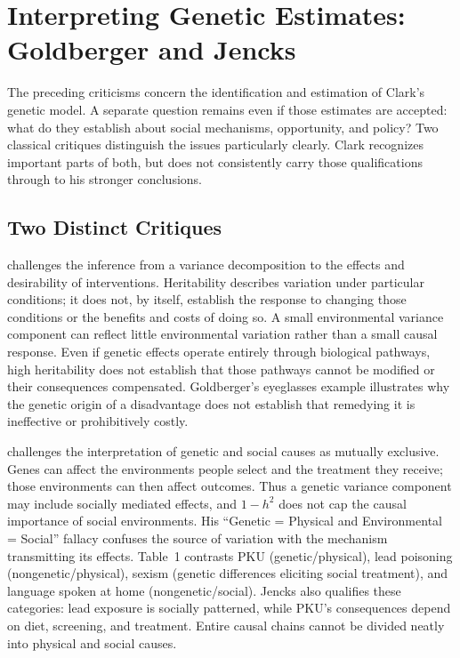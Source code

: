 \section{Interpreting Genetic Estimates: Goldberger and Jencks}
\label{sec:interpretation}

The preceding criticisms concern the identification and estimation of
Clark's genetic model. A separate question remains even if those estimates
are accepted: what do they establish about social mechanisms, opportunity,
and policy? Two classical critiques distinguish the issues particularly
clearly. Clark recognizes important parts of both, but does not consistently
carry those qualifications through to his stronger conclusions.

\subsection{Two Distinct Critiques}

\citet[pp.~344--346]{Goldberger1979} challenges the inference from a
variance decomposition to the effects and desirability of interventions.
Heritability describes variation under particular conditions; it does not,
by itself, establish the response to changing those conditions or the
benefits and costs of doing so. A small environmental variance component
can reflect little environmental variation rather than a small causal
response. Even if genetic effects operate entirely through biological
pathways, high heritability does not establish that those pathways cannot
be modified or their consequences compensated. Goldberger's eyeglasses
example illustrates why the genetic origin of a disadvantage does not
establish that remedying it is ineffective or prohibitively costly.

\citet[pp.~729--734]{Jencks1980} challenges the interpretation of genetic
and social causes as mutually exclusive. Genes can affect the environments
people select and the treatment they receive; those environments can then
affect outcomes. Thus a genetic variance component may include socially
mediated effects, and $1-h^2$ does not cap the causal importance of social
environments. His ``Genetic = Physical and Environmental = Social''
fallacy confuses the source of variation with the mechanism transmitting
its effects. Table~1 contrasts PKU (genetic/physical), lead poisoning
(nongenetic/physical), sexism (genetic differences eliciting social
treatment), and language spoken at home (nongenetic/social). Jencks also
qualifies these categories: lead exposure is socially patterned, while
PKU's consequences depend on diet, screening, and treatment. Entire
causal chains cannot be divided neatly into physical and social causes.

